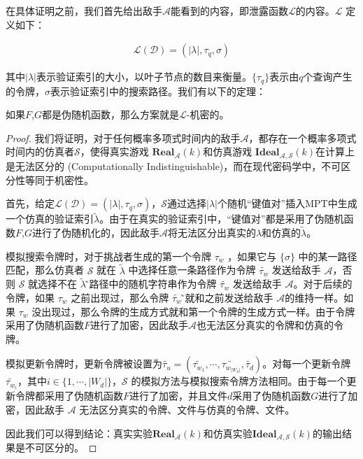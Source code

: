 在具体证明之前，我们首先给出敌手$\mathcal{A}$能看到的内容，即泄露函数$\mathcal{L}$的内容。$\mathcal{L}$ 定义如下：

\begin{align}
  \mathcal{L}(\mathcal{D})=(|\lambda|,{\tau}_q,{\sigma})
\end{align}

其中$|\lambda|$表示验证索引的大小，以叶子节点的数目来衡量。$\{\tau_q\}$表示由$q$个查询产生的令牌，$\sigma$表示验证索引中的搜索路径。我们有以下的定理：

\begin{theorem}
    如果$F$,$G$都是伪随机函数，那么方案\single 就是$\mathcal{L}$-机密的。
\end{theorem}

\begin{proof}
  我们将证明，对于任何概率多项式时间内的敌手$\mathcal{A}$，都存在一个概率多项式时间内的仿真者$\mathcal{S}$，使得真实游戏 $\mathbf{Real}_\mathcal{A}(k)$和仿真游戏 $\mathbf{Ideal}_\mathcal{A,S}(k)$在计算上是无法区分的 (Computationally Indistinguishable)，而在现代密码学中，不可区分性等同于机密性。

  首先，给定$\mathcal{L}(\mathcal{D})=(|\lambda|,{\tau}_q,{\sigma})$，$\mathcal{S}$通过选择$|\lambda|$个随机“键值对”插入MPT中生成一个仿真的验证索引$\tilde{\lambda}$。由于在真实的验证索引中，“键值对”都是采用了伪随机函数$F$,$G$进行了伪随机化的，因此敌手$\mathcal{A}$将无法区分出真实的$\lambda$和仿真的$\tilde{\lambda}$。

  模拟搜索令牌时，对于挑战者生成的第一个令牌 $\tau_w$ ，如果它与 $\{\sigma\}$ 中的某一路径匹配，那么仿真者 $\mathcal{S}$ 就在 $\tilde{\lambda}$ 中选择任意一条路径作为令牌 $\tilde{\tau_w}$ 发送给敌手 $\mathcal{A}$，否则 $\mathcal{S}$ 就选择不在 $\tilde{\lambda}$ ̃路径中的随机字符串作为令牌 $\tilde{\tau_w}$ 发送给敌手 $\mathcal{A}$。对于后续的令牌，如果 $\tau_w$ 之前出现过，那么令牌 $\tilde{\tau_w}$ ̃就和之前发送给敌手 $\mathcal{A}$的维持一样。如果 $\tau_w$ 没出现过，那么令牌的生成方式就和第一个令牌的生成方式一样。由于令牌采用了伪随机函数$F$进行了加密，因此敌手$\mathcal{A}$也无法区分真实的令牌和仿真的令牌。

  模拟更新令牌时，更新令牌被设置为$\tilde{\tau_u} = (\tilde{\tau_{w_1}},\cdots,\tilde{\tau_{w_{|W_d|}}},\tilde{\tau_d})$。对每一个更新令牌$\tilde{\tau_{w_i}}$，其中$i \in \{1,\cdots, |W_d|\}$，$\mathcal{S}$ 的模拟方法与模拟搜索令牌方法相同。由于每一个更新令牌都采用了伪随机函数$F$进行了加密，并且文件$d$采用了伪随机函数$G$进行了加密，因此敌手 $\mathcal{A}$ 无法区分真实的令牌、文件与仿真的令牌、文件。

  因此我们可以得到结论：真实实验$\mathbf{Real}_\mathcal{A}(k)$和仿真实验$\mathbf{Ideal}_\mathcal{A,S}(k)$的输出结果是不可区分的。
\end{proof}

